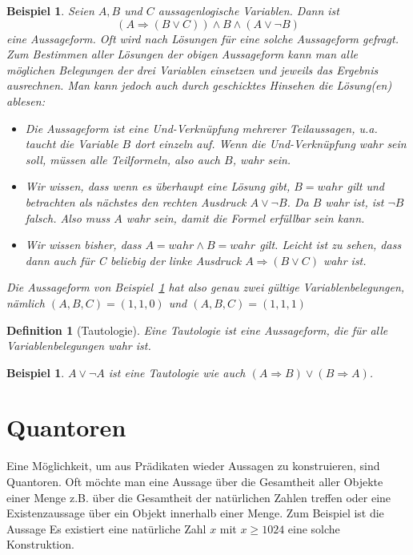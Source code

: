 \documentclass[a4paper]{article}
\newtheorem{beispiel}[satz]{Beispiel}
\newtheorem{definition}[satz]{Definition} %
\theoremstyle{nonumberplain}
\begin{document}
\begin{beispiel}\label{b:Aussageform}
Seien $A,B$ und $C$ aussagenlogische Variablen. Dann ist \[(A \Rightarrow (B \lor C)) \land B \land (A \lor \neg B)\] eine Aussageform. Oft wird nach Lösungen für eine solche Aussageform gefragt. Zum Bestimmen aller Lösungen der obigen Aussageform kann man alle möglichen Belegungen der drei Variablen einsetzen und jeweils das Ergebnis ausrechnen. Man kann jedoch auch durch geschicktes Hinsehen die Lösung(en) ablesen:
\begin{itemize}
\item Die Aussageform ist eine Und-Verknüpfung mehrerer Teilaussagen, u.a. taucht die Variable $B$ dort einzeln auf. Wenn die Und-Verknüpfung wahr sein soll, müssen alle Teilformeln, also auch $B$, wahr sein.
\item Wir wissen, dass wenn es überhaupt eine Lösung gibt, $B = wahr$ gilt und betrachten als nächstes den rechten Ausdruck $A \lor \neg B$. Da $B$ wahr ist, ist $\neg B$ falsch. Also muss $A$ wahr sein, damit die Formel erfüllbar sein kann.
\item Wir wissen bisher, dass $A = wahr \land B = wahr$ gilt. Leicht ist zu sehen, dass dann auch für C beliebig der linke Ausdruck $A \Rightarrow (B \lor C)$ wahr ist.
\end{itemize}
Die Aussageform von Beispiel~\ref{b:Aussageform} hat also genau zwei gültige Variablenbelegungen, nämlich $(A,B,C) = (1,1,0)$ und $(A,B,C) = (1,1,1)$
\end{beispiel}

\begin{definition}[Tautologie]
Eine Tautologie ist eine Aussageform, die für alle Variablenbelegungen wahr ist.
\end{definition}

\begin{beispiel}
$A \lor \neg A$ ist eine Tautologie wie auch $(A \Rightarrow B) \lor (B \Rightarrow A)$.
\end{beispiel}

\section{Quantoren}

Eine Möglichkeit, um aus Prädikaten wieder Aussagen zu konstruieren, sind Quantoren. Oft möchte man eine Aussage über die Gesamtheit aller Objekte einer Menge z.B. über die Gesamtheit der natürlichen Zahlen treffen oder eine Existenzaussage über ein Objekt innerhalb einer Menge. Zum Beispiel ist die Aussage \glqq Es existiert eine natürliche Zahl $x$ mit $x \geq 1024$\grqq{} eine solche Konstruktion.
\end{document}
